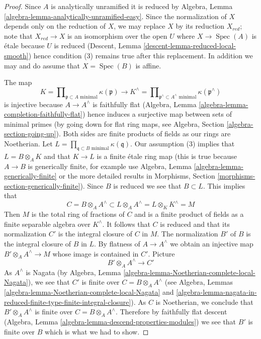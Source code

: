 \documentclass{stacks-project}
\theoremstyle{plain}
\theoremstyle{definition}
\theoremstyle{remark}
\numberwithin{equation}{subsection}
\def\Spec{\mathop{\mathrm{Spec}}}
\begin{document}
\begin{proof}
Since $A$ is analytically unramified it is reduced
by Algebra, Lemma \ref{algebra-lemma-analytically-unramified-easy}.
Since the normalization of $X$ depends only on the reduction
of $X$, we may replace $X$ by its reduction $X_{red}$; note
that $X_{red} \to X$ is an isomorphism over the open $U$ where
$X \to \Spec(A)$ is \'etale because $U$ is reduced
(Descent, Lemma \ref{descent-lemma-reduced-local-smooth})
hence condition (3) remains true after this replacement.
In addition we may and do assume that $X = \Spec(B)$ is affine.

\medskip\noindent
The map
$$
K = \prod\nolimits_{\mathfrak p \subset A\text{ minimal}} \kappa(\mathfrak p)
\longrightarrow
K^\wedge = \prod\nolimits_{\mathfrak p^\wedge \subset A^\wedge\text{ minimal}}
\kappa(\mathfrak p^\wedge)
$$
is injective because $A \to A^\wedge$ is faithfully flat
(Algebra, Lemma \ref{algebra-lemma-completion-faithfully-flat})
hence induces a surjective map between sets of minimal primes
(by going down for flat ring maps, see
Algebra, Section \ref{algebra-section-going-up}).
Both sides are finite products of fields as our rings are Noetherian.
Let $L = \prod_{\mathfrak q \subset B\text{ minimal}} \kappa(\mathfrak q)$.
Our assumption (3) implies that $L = B \otimes_A K$ and that
$K \to L$ is a finite \'etale ring map (this is true
because $A \to B$ is generically finite, for example use
Algebra, Lemma \ref{algebra-lemma-generically-finite}
or the more detailed results in Morphisms, Section
\ref{morphisms-section-generically-finite}).
Since $B$ is reduced we see that $B \subset L$.
This implies that
$$
C = B \otimes_A A^\wedge \subset
L \otimes_A A^\wedge = L \otimes_K K^\wedge = M
$$
Then $M$ is the total ring of fractions of $C$ and
is a finite product of fields as a finite separable
algebra over $K^\wedge$. It follows that $C$ is reduced
and that its normalization $C'$ is the integral closure of
$C$ in $M$. The normalization $B'$ of $B$ is the integral
closure of $B$ in $L$. By flatness of $A \to A^\wedge$
we obtain an injective map $B' \otimes_A A^\wedge \to M$ whose
image is contained in $C'$. Picture
$$
B' \otimes_A A^\wedge \longrightarrow C'
$$
As $A^\wedge$ is Nagata (by
Algebra, Lemma \ref{algebra-lemma-Noetherian-complete-local-Nagata}),
we see that $C'$ is finite over
$C = B \otimes_A A^\wedge$ (see
Algebra, Lemmas
\ref{algebra-lemma-Noetherian-complete-local-Nagata} and
\ref{algebra-lemma-nagata-in-reduced-finite-type-finite-integral-closure}).
As $C$ is Noetherian, we conclude that
$B' \otimes_A A^\wedge$ is finite over $C = B \otimes_A A^\wedge$.
Therefore by faithfully flat descent
(Algebra, Lemma \ref{algebra-lemma-descend-properties-modules})
we see that $B'$ is finite over $B$ which is what we had to show.
\end{proof}
\end{document}
